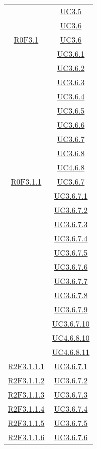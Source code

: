\begin{longtable}{|c|c|}
& \hyperlink{UC3.5}{UC3.5}\\
& \hyperlink{UC3.6}{UC3.6}\\
\hline
\hyperlink{R0F3.1}{R0F3.1} & \hyperlink{UC3.6}{UC3.6}\\
& \hyperlink{UC3.6.1}{UC3.6.1}\\
& \hyperlink{UC3.6.2}{UC3.6.2}\\
& \hyperlink{UC3.6.3}{UC3.6.3}\\
& \hyperlink{UC3.6.4}{UC3.6.4}\\
& \hyperlink{UC3.6.5}{UC3.6.5}\\
& \hyperlink{UC3.6.6}{UC3.6.6}\\
& \hyperlink{UC3.6.7}{UC3.6.7}\\
& \hyperlink{UC3.6.8}{UC3.6.8}\\
& \hyperlink{UC4.6.8}{UC4.6.8}\\
\hline
\hyperlink{R0F3.1.1}{R0F3.1.1} & \hyperlink{UC3.6.7}{UC3.6.7}\\
& \hyperlink{UC3.6.7.1}{UC3.6.7.1}\\
& \hyperlink{UC3.6.7.2}{UC3.6.7.2}\\
& \hyperlink{UC3.6.7.3}{UC3.6.7.3}\\
& \hyperlink{UC3.6.7.4}{UC3.6.7.4}\\
& \hyperlink{UC3.6.7.5}{UC3.6.7.5}\\
& \hyperlink{UC3.6.7.6}{UC3.6.7.6}\\
& \hyperlink{UC3.6.7.7}{UC3.6.7.7}\\
& \hyperlink{UC3.6.7.8}{UC3.6.7.8}\\
& \hyperlink{UC3.6.7.9}{UC3.6.7.9}\\
& \hyperlink{UC3.6.7.10}{UC3.6.7.10}\\
& \hyperlink{UC4.6.8.10}{UC4.6.8.10}\\
& \hyperlink{UC4.6.8.11}{UC4.6.8.11}\\
\hline
\hyperlink{R2F3.1.1.1}{R2F3.1.1.1} & \hyperlink{UC3.6.7.1}{UC3.6.7.1}\\
\hline
\hyperlink{R2F3.1.1.2}{R2F3.1.1.2} & \hyperlink{UC3.6.7.2}{UC3.6.7.2}\\
\hline
\hyperlink{R2F3.1.1.3}{R2F3.1.1.3} & \hyperlink{UC3.6.7.3}{UC3.6.7.3}\\
\hline
\hyperlink{R2F3.1.1.4}{R2F3.1.1.4} & \hyperlink{UC3.6.7.4}{UC3.6.7.4}\\
\hline
\hyperlink{R2F3.1.1.5}{R2F3.1.1.5} & \hyperlink{UC3.6.7.5}{UC3.6.7.5}\\
\hline
\hyperlink{R2F3.1.1.6}{R2F3.1.1.6} & \hyperlink{UC3.6.7.6}{UC3.6.7.6}\\

\end{longtable}
